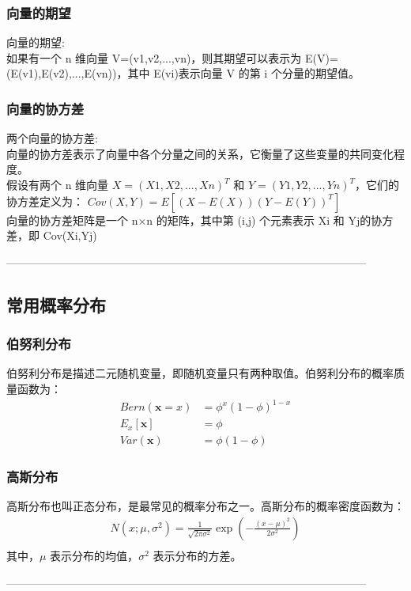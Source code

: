 \documentclass{article}
\begin{document}
\subsubsection{向量的期望}
向量的期望: \\
如果有一个 n 维向量 V=(v1,v2,...,vn)，则其期望可以表示为 E(V)=(E(v1),E(v2),...,E(vn))，其中 E(vi)表示向量 V 的第 i 个分量的期望值。

\subsubsection{向量的协方差}
两个向量的协方差: \\
向量的协方差表示了向量中各个分量之间的关系，它衡量了这些变量的共同变化程度。\\
假设有两个 n 维向量 $X=(X1,X2,...,Xn)^T$ 和 $Y=(Y1,Y2,...,Yn)^T$，它们的协方差定义为：
$Cov⁡(X,Y)=E⁡[(X−E(X))(Y−E(Y))^T]$ \\
向量的协方差矩阵是一个 n×n 的矩阵，其中第 (i,j) 个元素表示 Xi​ 和 Yj​ 的协方差，即 Cov⁡(Xi,Yj)

--------------------------------------------------------------------------------------------------

\subsection{常用概率分布}
\subsubsection{伯努利分布}
伯努利分布是描述二元随机变量，即随机变量只有两种取值。伯努利分布的概率质量函数为：
$$
\begin{aligned}
Bern(\mathbf{x}=x) &= \phi^x(1-\phi)^{1-x} \\
E_{x}[\mathbf{x}] &= \phi \\
Var(\mathbf{x}) &= \phi(1-\phi)
\end{aligned}
$$
\subsubsection{高斯分布}
高斯分布也叫正态分布，是最常见的概率分布之一。高斯分布的概率密度函数为：
$$
\begin{aligned}
N(x;\mu, \sigma^2) = \frac{1}{\sqrt{2\pi\sigma^2}} \exp (-\frac{(x-\mu)^2}{2\sigma^2} ) \\
\end{aligned}
$$
其中，$\mu$ 表示分布的均值，$\sigma^2$ 表示分布的方差。

--------------------------------------------------------------------------------------------------
\end{document}

